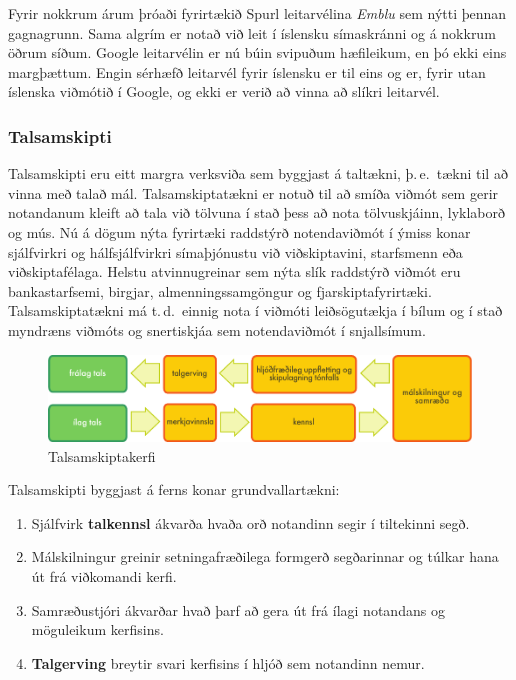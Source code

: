 \documentclass{../../metanetpaper}
\begin{document}
\begin{multicols}{2}
Fyrir nokkrum árum þróaði fyrirtækið Spurl leitarvélina \textit{Emblu} sem nýtti þennan gagnagrunn. Sama algrím er notað við leit í íslensku símaskránni og á nokkrum öðrum síðum. Google leitarvélin er nú búin svipuðum hæfileikum, en þó ekki eins margþættum. Engin sérhæfð leitarvél fyrir íslensku er til eins og er, fyrir utan íslenska viðmótið í Google, og ekki er verið að vinna að slíkri leitarvél.
  
\subsubsection{Talsamskipti}

Talsamskipti eru eitt margra verksviða sem byggjast á taltækni, þ.\,e.~tækni til að vinna með talað mál. Talsamskiptatækni er notuð til að smíða viðmót sem gerir notandanum kleift að tala við tölvuna í stað þess að nota tölvuskjáinn, lyklaborð og mús. Nú á dögum nýta fyrirtæki raddstýrð notendaviðmót í ýmiss konar sjálfvirkri og hálfsjálfvirkri símaþjónustu við viðskiptavini, starfsmenn eða viðskiptafélaga. Helstu atvinnugreinar sem nýta slík raddstýrð viðmót eru bankastarfsemi, birgjar, almenningssamgöngur og fjarskiptafyrirtæki. Talsamskiptatækni má t.\,d.~einnig nota í viðmóti leiðsögutækja í bílum og í stað myndræns viðmóts og snertiskjáa sem notendaviðmót í snjallsímum. 

\begin{figure}[htb]
  \center 
  \includegraphics[width=\textwidth]{../_media/icelandic/simple_speech-based_dialogue_architecture}
  \caption{Talsamskiptakerfi}
  \label{fig:dialoguearch_is}
\end{figure}

Talsamskipti byggjast á ferns konar grundvallartækni:

\begin{enumerate}
\item Sjálfvirk \textbf{talkennsl} ákvarða hvaða orð notandinn segir í tiltekinni segð. 
\item Málskilningur greinir setningafræðilega formgerð segðarinnar og túlkar hana út frá viðkomandi kerfi.
\item Samræðustjóri ákvarðar hvað þarf að gera út frá ílagi notandans og möguleikum kerfisins.
\item \textbf{Talgerving} breytir svari kerfisins í hljóð sem notandinn nemur. 
\end{enumerate}


\end{multicols}
\end{document}
